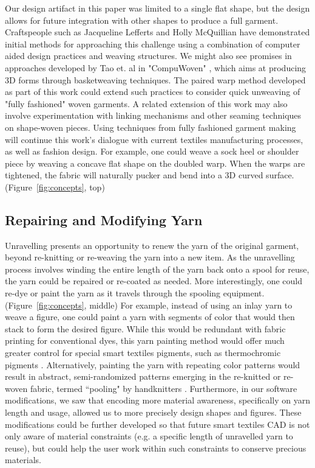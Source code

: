 \documentclass{sigchi}
\newcommand\shanel[1]{#1}
\begin{document}
Our design artifact in this paper was limited to a single flat shape, but the design allows for future integration with other shapes to produce a full garment. Craftspeople such as Jacqueline Lefferts \cite{lefferts_fullfashionedweaving} and Holly McQuillian \cite{mcquillan2019hybrid} have demonstrated initial methods for approaching this challenge using a combination of computer aided design practices and weaving structures. We might also see promises in approaches developed by Tao et. al in "CompuWoven" \cite{tao_compuwoven:_2016}, which aims at producing 3D forms through basketweaving techniques. The paired warp method developed as part of this work could extend such practices to consider quick unweaving of "fully fashioned" woven garments.  A related extension of this work may also involve experimentation with linking mechanisms and other seaming techniques on shape-woven pieces. Using techniques from fully fashioned garment making will continue this work's dialogue with current textiles manufacturing processes, as well as fashion design.  For example, one could weave a sock heel or shoulder piece by weaving a concave flat shape on the doubled warp. When the warps are tightened, the fabric will naturally pucker and bend into a 3D curved surface. (Figure~\ref{fig:concepts}, top)

\subsection{Repairing and Modifying Yarn}

\shanel{Unravelling presents an opportunity to renew the yarn of the original garment, beyond re-knitting or re-weaving the yarn into a new item. As the unravelling process involves winding the entire length of the yarn back onto a spool for reuse, the yarn could be repaired or re-coated as needed. More interestingly, one could re-dye or paint the yarn as it travels through the spooling equipment. (Figure~\ref{fig:concepts}, middle) For example, instead of using an inlay yarn to weave a figure, one could paint a yarn with segments of color that would then stack to form the desired figure. While this would be redundant with fabric printing for conventional dyes, this yarn painting method would offer much greater control for special smart textiles pigments, such as thermochromic pigments \cite{devendorf_adapting_2019}. Alternatively, painting the yarn with repeating color patterns would result in abstract, semi-randomized patterns emerging in the re-knitted or re-woven fabric, termed ``pooling" by handknitters \cite{plannedpooling}. Furthermore, in our software modifications, we saw that encoding more material awareness, specifically on yarn length and usage, allowed us to more precisely design shapes and figures. These modifications could be further developed so that future smart textiles CAD is not only aware of material constraints (e.g. a specific length of unravelled yarn to reuse), but could help the user work within such constraints to conserve precious materials.}
\end{document}
